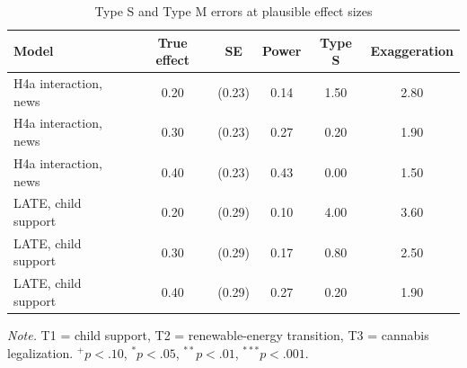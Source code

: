\begin{table}[htbp]
\centering
\begin{threeparttable}
\caption{Type S and Type M errors at plausible effect sizes}
\label{tab:tab_design_analysis}
\begin{tabular}{lccccc}
\toprule
  Model & True effect & SE & Power & Type S & Exaggeration \\
\midrule
  H4a interaction, news & 0.20 & (0.23) & 0.14 & 1.50 & 2.80 \\
  H4a interaction, news & 0.30 & (0.23) & 0.27 & 0.20 & 1.90 \\
  H4a interaction, news & 0.40 & (0.23) & 0.43 & 0.00 & 1.50 \\
  LATE, child support & 0.20 & (0.29) & 0.10 & 4.00 & 3.60 \\
  LATE, child support & 0.30 & (0.29) & 0.17 & 0.80 & 2.50 \\
  LATE, child support & 0.40 & (0.29) & 0.27 & 0.20 & 1.90 \\
\bottomrule
\end{tabular}
\begin{tablenotes}\footnotesize\item \textit{Note.} T1 = child support, T2 = renewable-energy transition, T3 = cannabis legalization. $^{+}p<.10$, $^{*}p<.05$, $^{**}p<.01$, $^{***}p<.001$.\end{tablenotes}
\end{threeparttable}
\end{table}
